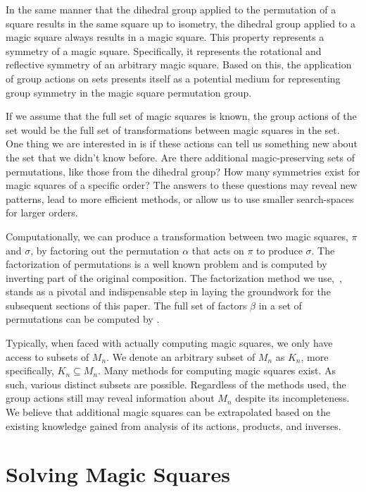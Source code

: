 \documentclass{rhumj_new}
\begin{document}
In the same manner that the dihedral group applied to the permutation of a square results in
the same square up to isometry, the dihedral group applied to a magic square always results in a
magic square. This property represents a symmetry of a magic square. Specifically, it represents
the rotational and reflective symmetry of an arbitrary magic square. Based on this, the application
of group actions on sets presents itself as a potential medium for representing group symmetry in
the magic square permutation group.

If we assume that the full set of magic squares is known, the group actions of the set would
be the full set of transformations between magic squares in the set. One thing we are interested in
is if these actions can tell us something new about the set that we didn't know before. Are there
additional magic-preserving sets of permutations, like those from the dihedral group? How many
symmetries exist for magic squares of a specific order? The answers to these questions may reveal
new patterns, lead to more efficient methods, or allow us to use smaller search-spaces for larger
orders.

Computationally, we can produce a transformation between two magic squares, $\pi$ and $\sigma$, by
factoring out the permutation $\alpha$ that acts on $\pi$ to produce $\sigma$. The factorization of
permutations is a well known problem and is computed by inverting part of the original composition.
The factorization method we use,~\unboldmath, stands as a
pivotal and indispensable step in laying the groundwork for the subsequent sections of this paper.
The full set of factors $\beta$ in a set of permutations can be computed by \unboldmath.

Typically, when faced with actually computing magic squares, we only have access to subsets of
$M_n$. We denote an arbitrary subset of $M_n$ as $K_n$, more specifically, $K_n \subseteq M_n$.
Many methods for computing magic squares exist. As such, various distinct subsets are possible.
Regardless of the methods used, the group actions still may reveal information about $M_n$ despite
its incompleteness. We believe that additional magic squares can be extrapolated based on the
existing knowledge gained from analysis of its actions, products, and inverses.

\section{Solving Magic Squares}
\end{document}
